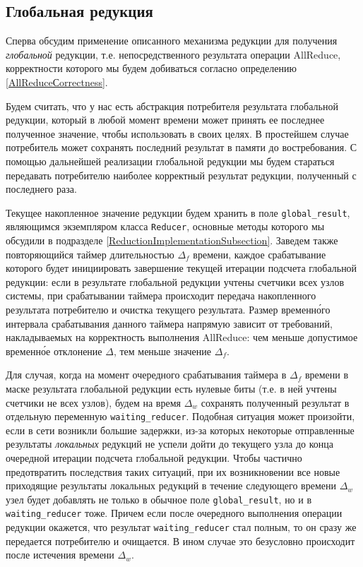 \subsection{Глобальная редукция}
\label{GlobalReductionsSubection}

Сперва обсудим применение описанного механизма редукции для получения \textit{глобальной} редукции, т.е. непосредственного результата операции AllReduce, корректности которого мы будем добиваться согласно определению \ref{AllReduceСorrectness}.

Будем считать, что у нас есть абстракция потребителя результата глобальной редукции, который в любой момент времени может принять ее последнее полученное значение, чтобы использовать в своих целях. В простейшем случае потребитель может сохранять последний результат в памяти до востребования. С помощью дальнейшей реализации глобальной редукции мы будем стараться передавать потребителю наиболее корректный результат редукции, полученный с последнего раза.

Текущее накопленное значение редукции будем хранить в поле \texttt{global\_result}, являющимся экземпляром класса \texttt{Reducer}, основные методы которого мы обсудили в подразделе \ref{ReductionImplementationSubsection}. Заведем также повторяющийся таймер длительностью $\Delta_f$ времени, каждое срабатывание которого будет инициировать завершение текущей итерации подсчета глобальной редукции: если в результате глобальной редукции учтены счетчики всех узлов системы, при срабатывании таймера происходит передача накопленного результата потребителю и очистка текущего результата. Размер временн\'{о}го интервала срабатывания данного таймера напрямую зависит от требований, накладываемых на корректность выполнения AllReduce: чем меньше допустимое временн\'{о}е отклонение $\Delta$, тем меньше значение $\Delta_f$.

Для случая, когда на момент очередного срабатывания таймера в $\Delta_f$ времени в маске результата глобальной редукции есть нулевые биты (т.е. в ней учтены счетчики не всех узлов), будем на время $\Delta_w$ сохранять полученный результат в отдельную переменную \texttt{waiting\_reducer}. Подобная ситуация может произойти, если в сети возникли большие задержки, из-за которых некоторые отправленные результаты \textit{локальных} редукций не успели дойти до текущего узла до конца очередной итерации подсчета глобальной редукции. Чтобы частично предотвратить последствия таких ситуаций, при их возникновении все новые приходящие результаты локальных редукций в течение следующего времени $\Delta_w$ узел будет добавлять не только в обычное поле \texttt{global\_result}, но и в \texttt{waiting\_reducer} тоже. Причем если после очередного выполнения операции редукции окажется, что результат \texttt{waiting\_reducer} стал полным, то он сразу же передается потребителю и очищается. В ином случае это безусловно происходит после истечения времени $\Delta_w$.

